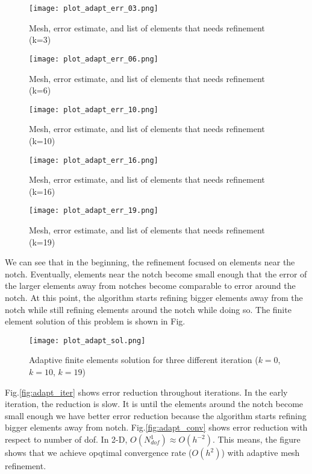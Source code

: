 \documentclass[11pt, letterpaper, hidelinks]{article}
\theoremstyle{definition}
\begin{document}
\begin{figure}[H]
    \texttt{[image: plot\_adapt\_err\_03.png]}
    \centering
    \caption{Mesh, error estimate, and list of elements that needs refinement (k=3)}
    \label{fig:adapt_err_03}
\end{figure}

\begin{figure}[H]
    \texttt{[image: plot\_adapt\_err\_06.png]}
    \centering
    \caption{Mesh, error estimate, and list of elements that needs refinement (k=6)}
    \label{fig:adapt_err_06}
\end{figure}

\begin{figure}[H]
    \texttt{[image: plot\_adapt\_err\_10.png]}
    \centering
    \caption{Mesh, error estimate, and list of elements that needs refinement (k=10)}
    \label{fig:adapt_err_10}
\end{figure}

\begin{figure}[H]
    \texttt{[image: plot\_adapt\_err\_16.png]}
    \centering
    \caption{Mesh, error estimate, and list of elements that needs refinement (k=16)}
    \label{fig:adapt_err_16}
\end{figure}

\begin{figure}[H]
    \texttt{[image: plot\_adapt\_err\_19.png]}
    \centering
    \caption{Mesh, error estimate, and list of elements that needs refinement (k=19)}
    \label{fig:adapt_err_19}
\end{figure}
We can see that in the beginning, the refinement focused on elements near the notch. Eventually, elements near the notch become small enough that the error of the larger elements away from notches become comparable to error around the notch. At this point, the algorithm starts refining bigger elements away from the notch while still refining elements around the notch while doing so. The finite element solution of this problem is shown in Fig.

\begin{figure}[H]
    \texttt{[image: plot\_adapt\_sol.png]}
    \centering
    \caption{Adaptive finite elements solution for three different iteration ($k=0$, $k=10$, $k=19$)}
    \label{fig:adapt_sol}
\end{figure}

Fig.\ref{fig:adapt_iter} shows error reduction throughout iterations. In the early iteration, the reduction is slow. It is until the elements around the notch become small enough we have better error reduction because the algorithm starts refining bigger elements away from notch.  Fig.\ref{fig:adapt_conv} shows error reduction with respect to number of dof. In 2-D, $O(N_{dof}^1) \approx O(h^{-2})$. This means, the figure shows that we achieve opqtimal convergence rate ($O(h^{2})$) with adaptive mesh refinement.
\end{document}
